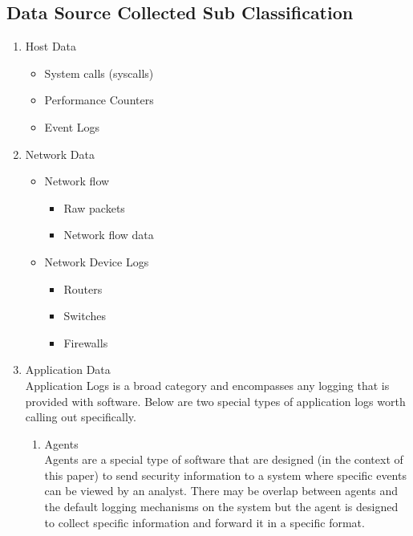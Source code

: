 \documentclass[10pt]{IEEEtran}
\begin{document}
\subsection{Data Source Collected Sub Classification}
\begin{enumerate}
    \item Host Data\cite{jia2017big}\cite{marchetti2016analysis}
    \begin{itemize}
        \item System calls (syscalls) \cite{warrender1999Anomaly Type}\cite{hofmeyr1998intrusion}
        \item Performance Counters
        \item Event Logs
    \end{itemize}
    \item Network Data
        \begin{itemize}
            \item Network flow \cite{kim2013detection}
            \begin{itemize}
                \item Raw packets
                \item Network flow data
            \end{itemize}
            \item Network Device Logs\cite{horne2002management}
            \begin{itemize}
                \item Routers
                \item Switches
                \item Firewalls
            \end{itemize}
        \end{itemize}
    \item Application Data\cite{giura2012context}\cite{ten2010cybersecurity}
    \\Application Logs is a broad category and encompasses any logging that is provided with software. Below are two special types of application logs worth calling out specifically.
        \begin{enumerate}
            \item Agents\cite{garcia2009anomaly}
            \\Agents are a special type of software that are designed (in the context of this paper) to send security information to a system where specific events can be viewed by an analyst. There may be overlap between agents and the default logging mechanisms on the system but the agent is designed to collect specific information and forward it in a specific format.

\end{enumerate}
\end{enumerate}
\end{document}
